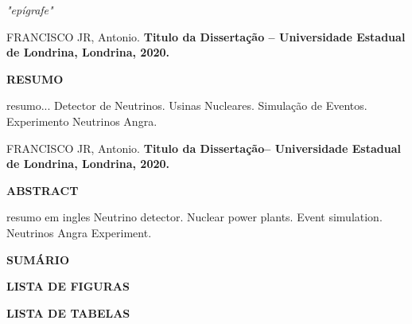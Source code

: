 \documentclass[12pt,a4paper]{report}
\theoremstyle{definition}
\begin{document}
\newpage
\thispagestyle{empty}
\vspace*{16cm}
\noindent \hspace{7.cm} 
\begin{minipage}{8.cm}
\textit{"epígrafe" 
}
\end{minipage}

\newpage
\thispagestyle{empty}
\begin{singlespace}
 \noindent \uppercase{Francisco Jr}, Antonio. {\bf Titulo da Dissertação -- Universidade Estadual de Londrina, Londrina, 2020.}
\vspace{1pc}
\begin{center}
\uppercase{\bf RESUMO}
\end{center}
\vspace{1pc}
\noindent resumo...
\vspace{2pc}
 Detector de Neutrinos. Usinas Nucleares. Simulação de Eventos. Experimento Neutrinos Angra.
\end{singlespace}

\newpage
\thispagestyle{empty}
\begin{singlespace}
\noindent \uppercase{Francisco Jr}, Antonio. {\bf Titulo da Dissertação-- Universidade Estadual de Londrina, Londrina, 2020.}
\vspace{1pc}
\begin{center}
\uppercase{\bf ABSTRACT}
\end{center}
\vspace{1pc}
\noindent resumo em ingles
\vspace{2pc}
 Neutrino detector. Nuclear power plants. Event simulation. Neutrinos Angra Experiment.
\end{singlespace}

\begingroup
\let\clearpage\relax
\newpage
\begin{center}
\MakeUppercase{\bf Sumário}
\end{center}
\tableofcontents
\thispagestyle{empty}
\newpage
\begin{center}
\MakeUppercase{\bf Lista de Figuras}
\end{center}
\listoffigures
\thispagestyle{empty}
\newpage
\begin{center}
\MakeUppercase{\bf Lista de Tabelas}
\end{center}
\listoftables
\thispagestyle{empty}
\endgroup
\end{document}

